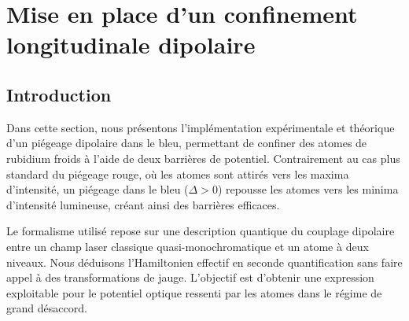 \chapter{Mise en place d'un confinement longitudinale dipolaire}
\minitoc


\section*{Introduction}

Dans cette section, nous présentons l’implémentation expérimentale et théorique d’un piégeage dipolaire dans le bleu, permettant de confiner des atomes de rubidium froids à l’aide de deux barrières de potentiel. Contrairement au cas plus standard du piégeage rouge, où les atomes sont attirés vers les maxima d’intensité, un piégeage dans le bleu ($\Delta > 0$) repousse les atomes vers les minima d’intensité lumineuse, créant ainsi des barrières efficaces.

Le formalisme utilisé repose sur une description quantique du couplage dipolaire entre un champ laser classique quasi-monochromatique et un atome à deux niveaux. Nous déduisons l’Hamiltonien effectif en seconde quantification sans faire appel à des transformations de jauge. L’objectif est d’obtenir une expression exploitable pour le potentiel optique ressenti par les atomes dans le régime de grand désaccord.

%    
%

